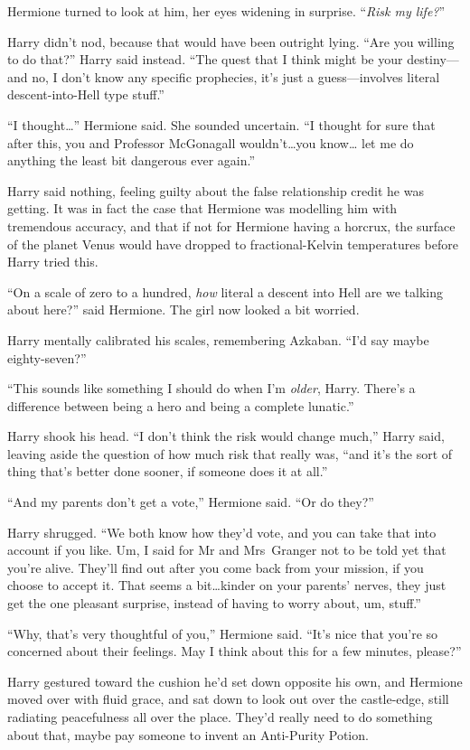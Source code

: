 Hermione turned to look at him, her eyes widening in surprise. “\emph{Risk my life?}”

Harry didn’t nod, because that would have been outright lying. “Are you willing to do that?” Harry said instead. “The quest that I think might be your destiny—and no, I don’t know any specific prophecies, it’s just a guess—involves literal descent-into-Hell type stuff.”

“I thought…” Hermione said. She sounded uncertain. “I thought for sure that after this, you and Professor McGonagall wouldn’t…you know… let me do anything the least bit dangerous ever again.”

Harry said nothing, feeling guilty about the false relationship credit he was getting. It was in fact the case that Hermione was modelling him with tremendous accuracy, and that if not for Hermione having a horcrux, the surface of the planet Venus would have dropped to fractional-Kelvin temperatures before Harry tried this.

“On a scale of zero to a hundred, \emph{how} literal a descent into Hell are we talking about here?” said Hermione. The girl now looked a bit worried.

Harry mentally calibrated his scales, remembering Azkaban. “I’d say maybe eighty-seven?”

“This sounds like something I should do when I’m \emph{older}, Harry. There’s a difference between being a hero and being a complete lunatic.”

Harry shook his head. “I don’t think the risk would change much,” Harry said, leaving aside the question of how much risk that really was, “and it’s the sort of thing that’s better done sooner, if someone does it at all.”

“And my parents don’t get a vote,” Hermione said. “Or do they?”

Harry shrugged. “We both know how they’d vote, and you can take that into account if you like. Um, I said for Mr and Mrs~Granger not to be told yet that you’re alive. They’ll find out after you come back from your mission, if you choose to accept it. That seems a bit…kinder on your parents’ nerves, they just get the one pleasant surprise, instead of having to worry about, um, stuff.”

“Why, that’s very thoughtful of you,” Hermione said. “It’s nice that you’re so concerned about their feelings. May I think about this for a few minutes, please?”

Harry gestured toward the cushion he’d set down opposite his own, and Hermione moved over with fluid grace, and sat down to look out over the castle-edge, still radiating peacefulness all over the place. They’d really need to do something about that, maybe pay someone to invent an Anti-Purity Potion.

